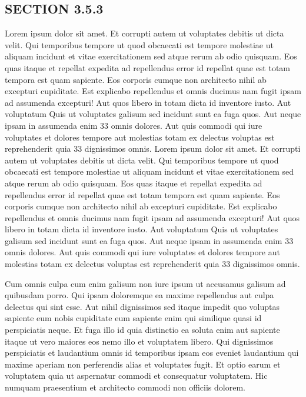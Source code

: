\documentclass[a4paper,12pt]{report}
\begin{document}
\subsection{SECTION 3.5.3}
\hspace{.5cm} Lorem ipsum dolor sit amet. Et corrupti autem ut voluptates debitis ut dicta velit. Qui temporibus tempore ut quod obcaecati est tempore molestiae ut aliquam incidunt et vitae exercitationem sed atque rerum ab odio quisquam. Eos quas itaque et repellat expedita ad repellendus error id repellat quae est totam tempora est quam sapiente. Eos corporis cumque non architecto nihil ab excepturi cupiditate. Est explicabo repellendus et omnis ducimus nam fugit ipsam ad assumenda excepturi! Aut quos libero in totam dicta id inventore iusto. Aut voluptatum Quis ut voluptates galisum sed incidunt sunt ea fuga quos. Aut neque ipsam in assumenda enim 33 omnis dolores. Aut quis commodi qui iure voluptates et dolores tempore aut molestias totam ex delectus voluptas est reprehenderit quia 33 dignissimos omnis. Lorem ipsum dolor sit amet. Et corrupti autem ut voluptates debitis ut dicta velit. Qui temporibus tempore ut quod obcaecati est tempore molestiae ut aliquam incidunt et vitae exercitationem sed atque rerum ab odio quisquam. Eos quas itaque et repellat expedita ad repellendus error id repellat quae est totam tempora est quam sapiente. Eos corporis cumque non architecto nihil ab excepturi cupiditate. Est explicabo repellendus et omnis ducimus nam fugit ipsam ad assumenda excepturi! Aut quos libero in totam dicta id inventore iusto. Aut voluptatum Quis ut voluptates galisum sed incidunt sunt ea fuga quos. Aut neque ipsam in assumenda enim 33 omnis dolores. Aut quis commodi qui iure voluptates et dolores tempore aut molestias totam ex delectus voluptas est reprehenderit quia 33 dignissimos omnis.
\par Cum omnis culpa cum enim galisum non iure ipsum ut accusamus galisum ad quibusdam porro. Qui ipsam doloremque ea maxime repellendus aut culpa delectus qui sint esse. Aut nihil dignissimos sed itaque impedit quo voluptas sapiente eum nobis cupiditate eum sapiente enim qui similique quasi id perspiciatis neque. Et fuga illo id quia distinctio ea soluta enim aut sapiente itaque ut vero maiores eos nemo illo et voluptatem libero. Qui dignissimos perspiciatis et laudantium omnis id temporibus ipsam eos eveniet laudantium qui maxime aperiam non perferendis alias et voluptates fugit. Et optio earum et voluptatem quia ut aspernatur commodi et consequatur voluptatem. Hic numquam praesentium et architecto commodi non officiis dolorem. 
\end{document}
